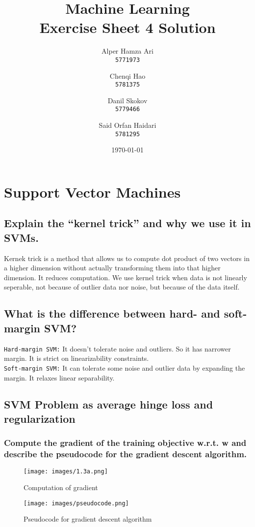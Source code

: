 \documentclass{article}
\title{
Machine Learning \\
[0.2em]Exercise Sheet 4 Solution
}
\author{
  Alper Hamza Ari\\
  \texttt{5771973}
  \and
  Chenqi Hao\\
  \texttt{5781375}
  \and
  Danil Skokov\\
  \texttt{5779466}
  \and
  Said Orfan Haidari\\
  \texttt{5781295}
}
\date{\today}
\begin{document}
\raggedright
\maketitle

\section{Support Vector Machines}
\subsection{Explain the “kernel trick” and why we use it in SVMs.}
Kernek trick is a method that allows us to compute dot product of two vectors in a higher dimension without actually transforming them into that higher dimension. It reduces computation. We use kernel trick when data is not linearly seperable, not because of outlier data nor noise, but because of the data itself.

\subsection {What is the difference between hard- and soft-margin SVM?}
\texttt{Hard-margin SVM:} It doesn't tolerate noise and outliers. So it has narrower margin. It is strict on linearizability constraints.\\
\texttt{Soft-margin SVM:} It can tolerate some noise and outlier data by expanding the margin. It relaxes linear separability.  

\subsection{SVM Problem as average hinge loss and regularization}
\subsubsection{Compute the gradient of the training objective w.r.t. w and describe
the pseudocode for the gradient descent algorithm.}
    \begin{figure}[H]
        \centering
        \texttt{[image: images/1.3a.png]}
        \caption{Computation of gradient}
        \label{fig:1.3a}
    \end{figure}

    
    \begin{figure}[H]
        \centering
        \texttt{[image: images/pseudocode.png]}
        \caption{Pseudocode for gradient descent algorithm}
        \label{fig:1.3apseudo}
    \end{figure}    
\end{document}
